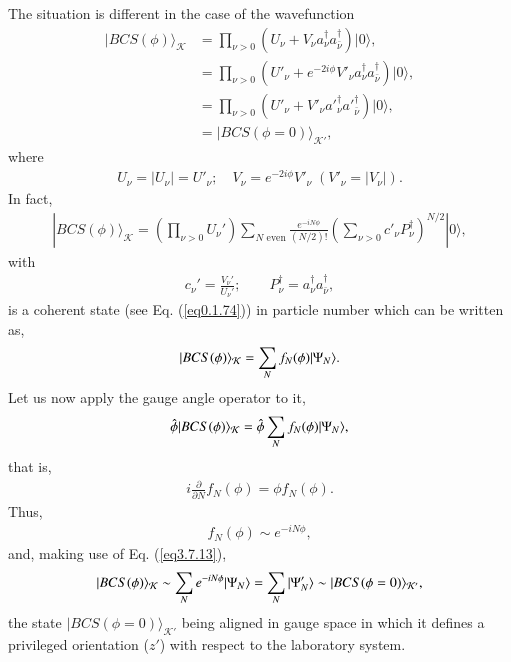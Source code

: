The situation is  different in the case of the wavefunction
\begin{align}\label{eq3.7.7}
\nonumber|BCS(\phi)\rangle_{\mathcal{K}} &=\prod_{\nu>0}\left(U_\nu+V_\nu a_\nu^\dagger a_{\bar \nu}^{\dagger}\right)|0\rangle,\\
\nonumber&=\prod_{\nu>0}\left(U'_\nu+e^{-2i\phi}V'_\nu a^\dagger_\nu a^{\dagger}_{\bar \nu}\right)|0\rangle,\\
\nonumber&=\prod_{\nu>0}\left(U'_\nu+V'_\nu a'^\dagger_\nu a'^{\dagger}_{\bar \nu}\right)|0\rangle,\\
&=|BCS(\phi=0)\rangle_{\mathcal{K'}},
\end{align}
where 
\begin{align}
U_\nu=|U_\nu|=U'_\nu;\quad V_\nu=e^{-2i\phi}V'_\nu \;(V'_\nu=|V_\nu|).
\end{align}
In fact,
\begin{align}\label{eq3.7.19}
|BCS(\phi)\rangle_{\mathcal{K}}=\left(\prod_{\nu>0}U_\nu'\right)\sum_{N\text{ even}}\frac{e^{-iN\phi}}{(N/2)!}\left(\sum_{\nu>0}c'_\nu P^\dagger_\nu\right)^{N/2}|0\rangle,
\end{align}
with
\begin{align}
c_\nu'=\frac{V_\nu'}{U_\nu'};\quad \quad P^\dagger_\nu=a^\dagger_\nu a^\dagger_{\bar\nu},
\end{align}
is a coherent state (see Eq. (\ref{eq0.1.74})) in particle number which can be written as,
\begin{align}\label{eq3.7.21}
|{BCS(\phi)} \rangle_{\mathcal K}=\sum_N f_N(\phi)|{\Psi_N} \rangle.
\end{align}
Let us now apply the gauge angle operator to it,
\begin{align}
\hat{\phi}|{BCS(\phi)} \rangle_{\mathcal K}=\hat{\phi}\sum_{N}f_N(\phi)|{\Psi_N} \rangle,
\end{align}
that is,
\begin{align}
i\frac{\partial}{\partial N}f_N(\phi)=\phi f_N(\phi).
\end{align}
Thus,
\begin{align}
f_N(\phi)\sim e^{-iN\phi},
\end{align}
and, making use of Eq. (\ref{eq3.7.13}),
\begin{align}\label{eq4.7.25}
|{BCS(\phi)} \rangle_{\mathcal K}\sim \sum_{N} e^{-iN\phi}|{\Psi_N} \rangle=\sum_N |{\Psi'_{N}} \rangle\sim|{BCS(\phi=0)} \rangle_{\mathcal K'},
\end{align}
 the state $|BCS(\phi=0)\rangle_{\mathcal{K}'}$ being aligned in gauge space in which it defines a privileged orientation ($z'$) with respect to the laboratory system.


